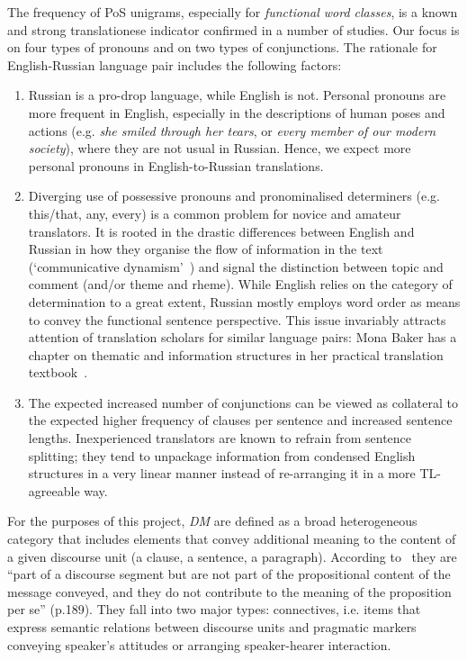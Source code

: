 The frequency of PoS unigrams, especially for \textit{functional word classes}, is a known and strong translationese indicator confirmed in a number of studies. Our focus is on four types of pronouns and on two types of conjunctions. 
The rationale for English-Russian language pair includes the following factors: 
\begin{enumerate}\compresslist{}
	\item Russian is a pro-drop language, while English is not. Personal pronouns are more frequent in English, especially in the descriptions of human poses and actions (e.g. \textit{she smiled through her tears}, or \textit{every member of our modern society}), where they are not usual in Russian. Hence, we expect more personal pronouns in English-to-Russian translations. 
	\item Diverging use of possessive pronouns and pronominalised determiners (e.g. this/that, any, every) is a common problem for novice and amateur translators. It is rooted in the drastic differences between English and Russian in how they organise the flow of information in the text (`communicative dynamism'~\cite{Firbas1992}) and signal the distinction between topic and comment (and/or theme and rheme). While English relies on the category of determination to a great extent, Russian mostly employs word order as means to convey the functional sentence perspective. This issue invariably attracts attention of translation scholars for similar language pairs: Mona Baker has a chapter on thematic and information structures in her practical translation textbook~\cite{Baker2011}.
	\item The expected increased number of conjunctions can be viewed as collateral to the expected higher frequency of clauses per sentence and increased sentence lengths. Inexperienced translators are known to refrain from sentence splitting; they tend to unpackage information from condensed English structures in a very linear manner instead of re-arranging it in a more TL-agreeable way.  
\end{enumerate}

For the purposes of this project, \textit{\gls{DM}} are defined as a broad heterogeneous category that includes elements that convey additional meaning to the content of a given discourse unit (a clause, a sentence, a paragraph). According to~\citet{Fraser2006} they are ``part of a discourse segment but are not part of the propositional content of the message conveyed, and they do not contribute to the meaning of the proposition per se'' (p.189). They fall into two major types: connectives, i.e. items that express semantic relations between discourse units and pragmatic markers conveying speaker's attitudes or arranging speaker-hearer interaction. 

